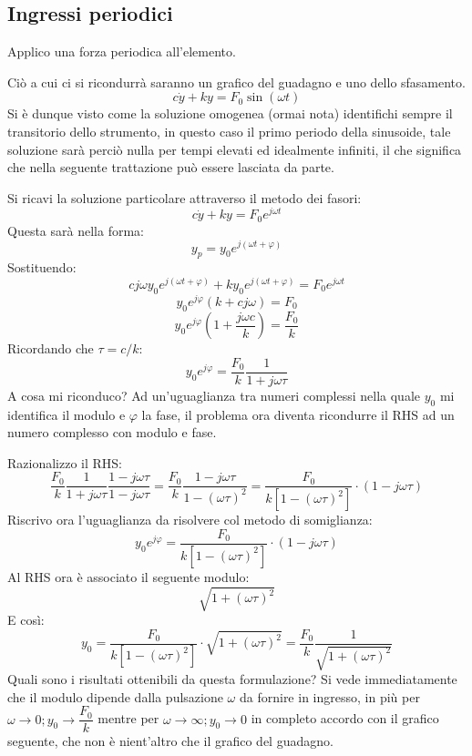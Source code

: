 \documentclass[a4paper, 15pt]{article}
\begin{document}
\subsection{Ingressi periodici} 	
\begin{adjustwidth}{2in}{}		
	Applico una forza periodica all'elemento. 
	
	Ciò a cui ci si ricondurrà saranno un grafico del guadagno e uno dello sfasamento. 
	\[ c\dot{y}  + ky = F_0\sin(\omega t)\]
	Si è dunque visto come la soluzione omogenea (ormai nota) identifichi sempre il transitorio dello strumento, in questo caso il primo periodo della sinusoide, tale soluzione sarà perciò nulla per tempi elevati ed idealmente infiniti, il che significa che nella seguente trattazione può essere lasciata da parte. \newline 
	
	Si ricavi la soluzione particolare attraverso il metodo dei fasori:
	\[ c\dot{y}  + ky = F_0e^{j\omega t}\]
	Questa sarà nella forma:
	\[y_p = y_0e^{j(\omega t + \varphi)}\]
	Sostituendo:
	\[ cj\omega y_0e^{j(\omega t + \varphi)}  + ky_0e^{j(\omega t + \varphi)} = F_0e^{j\omega t}\]
	\[ y_0e^{j\varphi}(k + cj\omega) = F_0\]
	\[  y_0e^{j\varphi} (1 + \dfrac{j\omega c}{k}) = \dfrac{F_0}{k} \]
	Ricordando che $\tau = c/k$:
	\[  y_0e^{j\varphi} = \dfrac{F_0}{k} \dfrac{1}{1+j\omega \tau} \]
	A cosa mi riconduco? Ad un'uguaglianza tra numeri complessi nella quale $y_0$ mi identifica il modulo e $\varphi$ la fase, il problema ora diventa ricondurre il RHS ad un numero complesso con modulo e fase. \newline 
	
	Razionalizzo il RHS: 
	\[\dfrac{F_0}{k} \dfrac{1}{1+j\omega \tau} \dfrac{1-j\omega \tau}{1-j\omega \tau} = \dfrac{F_0}{k} \dfrac{1-j\omega \tau}{1-(\omega \tau)^2} = \dfrac{F_0}{k[1-(\omega \tau)^2]} \cdot (1-j\omega \tau)  \]
	Riscrivo ora l'uguaglianza da risolvere col metodo di somiglianza:
	\[  y_0e^{j\varphi} = \dfrac{F_0}{k[1-(\omega \tau)^2]} \cdot (1-j\omega \tau) \]
	Al RHS ora è associato il seguente modulo: 
	\[ \sqrt{1+(\omega \tau)^2} \]
	E così: 
	\[ y_0 = \dfrac{F_0}{k[1-(\omega \tau)^2]} \cdot \sqrt{1+(\omega \tau)^2} = \dfrac{F_0}{k}\dfrac{1}{\sqrt{1+(\omega \tau)^2}} \]
	Quali sono i risultati ottenibili da questa formulazione? Si vede immediatamente che il modulo dipende dalla pulsazione $\omega$ da fornire in ingresso, \newline in più per $\omega \rightarrow 0; y_0 \rightarrow \dfrac{F_0}{k}$ mentre per $\omega \rightarrow \infty; y_0 \rightarrow 0$ in completo accordo con il grafico seguente, che non è nient'altro che il grafico del guadagno. 
	

\end{adjustwidth}
\end{document}
